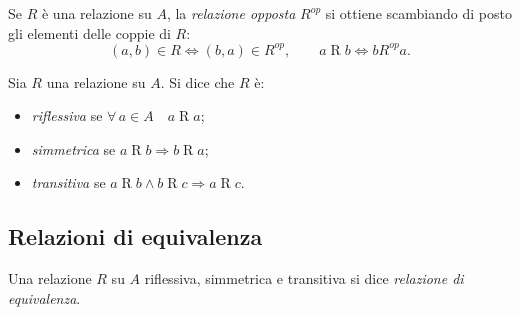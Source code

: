 \documentclass[11pt,a4paper]{article}
\begin{document}
\begin{definizione}
Se $R$ è una relazione su $A$, la \emph{relazione opposta} $R^{op}$ si
ottiene scambiando di posto gli elementi delle coppie di $R$:
\[
(a, b) \in R \iff (b, a) \in R^{op}, \qquad
a \mathrel{R} b \iff b \mathrel{R^{op}} a.
\]
\end{definizione}

\begin{definizione}
Sia $R$ una relazione su $A$. Si dice che $R$ è:
\begin{itemize}
    \item \emph{riflessiva} se $\forall\, a \in A \quad a \mathrel{R} a$;
    \item \emph{simmetrica} se $a \mathrel{R} b \Rightarrow
          b \mathrel{R} a$;
    \item \emph{transitiva} se $a \mathrel{R} b \land b \mathrel{R} c
          \Rightarrow a \mathrel{R} c$.
\end{itemize}
\end{definizione}

\subsection{Relazioni di equivalenza}

\begin{definizione}
Una relazione $R$ su $A$ riflessiva, simmetrica e transitiva si dice
\emph{relazione di equivalenza}.
\end{definizione}
\end{document}
